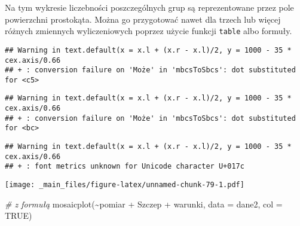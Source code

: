 \documentclass[
]{book}
\newenvironment{Shaded}{\begin{snugshade}}{\end{snugshade}}
\newcommand{\AttributeTok}[1]{\textcolor[rgb]{0.77,0.63,0.00}{#1}}
\newcommand{\CommentTok}[1]{\textcolor[rgb]{0.56,0.35,0.01}{\textit{#1}}}
\newcommand{\ConstantTok}[1]{\textcolor[rgb]{0.00,0.00,0.00}{#1}}
\newcommand{\FunctionTok}[1]{\textcolor[rgb]{0.00,0.00,0.00}{#1}}
\newcommand{\NormalTok}[1]{#1}
\newcommand{\SpecialCharTok}[1]{\textcolor[rgb]{0.00,0.00,0.00}{#1}}
\newcommand{\StringTok}[1]{\textcolor[rgb]{0.31,0.60,0.02}{#1}}
\begin{document}
Na tym wykresie liczebności poszczególnych grup są reprezentowane przez pole powierzchni prostokąta. Można go przygotować nawet dla trzech lub więcej różnych zmiennych wyliczeniowych poprzez użycie funkcji \texttt{table} albo formuły.

\begin{Shaded}
\end{Shaded}

\begin{verbatim}
## Warning in text.default(x = x.l + (x.r - x.l)/2, y = 1000 - 35 * cex.axis/0.66
## + : conversion failure on 'Może' in 'mbcsToSbcs': dot substituted for <c5>
\end{verbatim}

\begin{verbatim}
## Warning in text.default(x = x.l + (x.r - x.l)/2, y = 1000 - 35 * cex.axis/0.66
## + : conversion failure on 'Może' in 'mbcsToSbcs': dot substituted for <bc>
\end{verbatim}

\begin{verbatim}
## Warning in text.default(x = x.l + (x.r - x.l)/2, y = 1000 - 35 * cex.axis/0.66
## + : font metrics unknown for Unicode character U+017c
\end{verbatim}

\texttt{[image: \_main\_files/figure-latex/unnamed-chunk-79-1.pdf]}

\begin{Shaded}
\begin{Highlighting}[]
\CommentTok{\# z formułą}
\FunctionTok{mosaicplot}\NormalTok{(}\SpecialCharTok{\textasciitilde{}}\NormalTok{pomiar }\SpecialCharTok{+}\NormalTok{ Szczep }\SpecialCharTok{+}\NormalTok{ warunki, }\AttributeTok{data =}\NormalTok{ dane2, }\AttributeTok{col =} \ConstantTok{TRUE}\NormalTok{)}
\end{Highlighting}
\end{Shaded}
\end{document}
